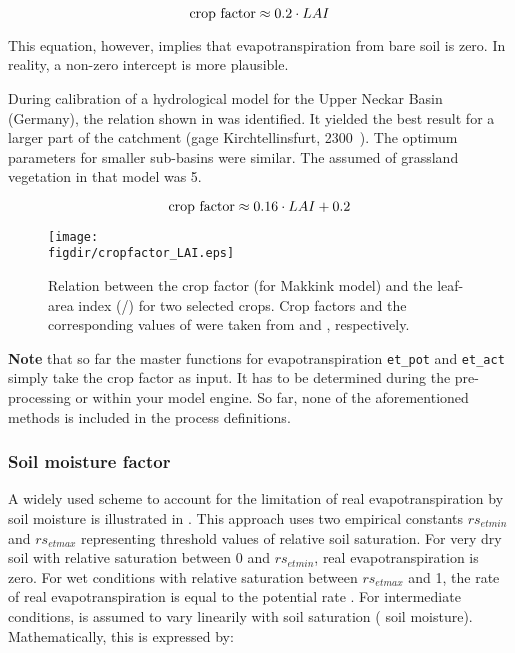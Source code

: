 \begin{equation} \label{eqn:eta:cropfactor-LAI-simple}
  \text{crop factor} \approx 0.2 \cdot LAI
\end{equation}

This equation, however, implies that evapotranspiration from bare soil is zero. In reality, a non-zero intercept is more plausible.

During calibration of a hydrological model for the Upper Neckar Basin (Germany), the relation shown in  was identified. It yielded the best result for a larger part of the catchment (gage Kirchtellinsfurt, 2300~\sqkm). The optimum parameters for smaller sub-basins were similar. The assumed \leafAreaIndex{} of grassland vegetation in that model was 5.

\begin{equation} \label{eqn:eta:cropfactor-LAI-Neckar}
  \text{crop factor} \approx 0.16 \cdot LAI + 0.2 
\end{equation}



\begin{figure}
  \centering
  \texttt{[image: \\figdir/cropfactor\_LAI.eps]}
  \caption[Relation between the crop factor (for Makkink model) and the leaf-area index (\sqm/\sqm) for two selected crops.]{Relation between the crop factor (for Makkink model) and the leaf-area index (\sqm/\sqm) for two selected crops. Crop factors and the corresponding values of \leafAreaIndex{} were taken from \citet{Feddes1987} and \citet{Ludwig2006}, respectively. \label{fig:et:real:cropfactor-LAI}}
\end{figure}

\textbf{Note} that so far the master functions for evapotranspiration \verb!et_pot! and \verb!et_act! simply take the crop factor as input. It has to be determined during the pre-processing or within your model engine. So far, none of the aforementioned methods is included in the process definitions.

\subsubsection{Soil moisture factor} \label{sec:eta:soilmoisture}

A widely used scheme to account for the limitation of real evapotranspiration by soil moisture is illustrated in . This approach uses two empirical constants $rs_{et min}$ and $rs_{et max}$ representing threshold values of relative soil saturation. For very dry soil with relative saturation between 0 and $rs_{et min}$, real evapotranspiration is zero. For wet conditions with relative saturation between $rs_{et max}$ and 1, the rate of real evapotranspiration \etReal{} is equal to the potential rate \etPot{}. For intermediate conditions, \etReal{} is assumed to vary linearily with soil saturation (\ie{} soil moisture). Mathematically, this is expressed by:

